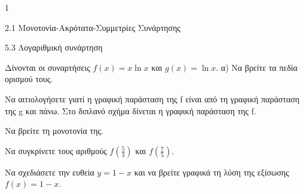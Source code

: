 \begin{ylh}{1}
\item 2.1 Μονοτονία-Ακρότατα-Συμμετρίες Συνάρτησης
\item 5.3 Λογαριθμική συνάρτηση
\end{ylh}
Δίνονται οι συναρτήσεις $f(x) = x \ln x$ και $g(x) = \ln x$.
α) Να βρείτε τα πεδία ορισμού τους.
\begin{alist}
\item Να αιτιολογήσετε γιατί η γραφική παράσταση της f είναι από τη γραφική παράσταση της g και πάνω.
Στο διπλανό σχήμα δίνεται η γραφική παράσταση της f.

\begin{center}
\end{center}
\begin{rlist}
\item Να βρείτε τη μονοτονία της.
\item Να συγκρίνετε τους αριθμούς $f\left(\frac{5}{3}\right)$ και $f\left(\frac{7}{5}\right)$.
\end{rlist}
\item Να σχεδιάσετε την ευθεία $y = 1 - x$ και να βρείτε γραφικά τη λύση της εξίσωσης $f(x) = 1 - x$.
\end{alist}

